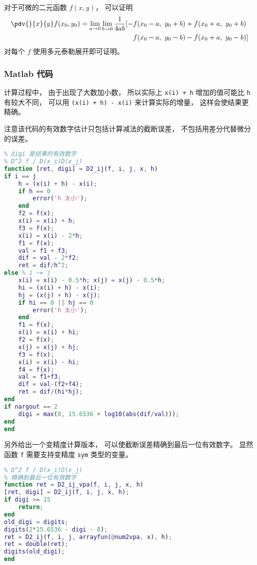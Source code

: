 
\begin{issues}
\issueDraft
\end{issues}


对于可微的二元函数 $f(x,y)$， 可以证明
\begin{equation}
\begin{aligned}
\pdv{}{x}{y} f(x_0,y_0) = \lim_{a\to 0}\lim_{b\to 0}\frac{1}{4ab}[-& f(x_0-a,\ y_0+b) + f(x_0+a,\  y_0+b)\\
& f(x_0-a,\  y_0-b) - f(x_0+a,\  y_0-b)]
\end{aligned}
\end{equation}
对每个 $f$ 使用多元泰勒展开即可证明。

\subsubsection{Matlab 代码}

计算过程中， 由于出现了大数加小数， 所以实际上 \verb|x(i) + h| 增加的值可能比 \verb|h| 有较大不同， 可以用 \verb|(x(i) + h) - x(i)| 来计算实际的增量， 这样会使结果更精确。

注意该代码的有效数字估计只包括计算减法的截断误差， 不包括用差分代替微分的误差。
\begin{lstlisting}[language=matlab, caption=D2\_ij.m]
% 数值二阶偏导
% digi 是结果的有效数字
% D^2 f / D(x_i)D(x_j)
function [ret, digi] = D2_ij(f, i, j, x, h)
if i == j
    h = (x(i) + h) - x(i);
    if h == 0
        error('h 太小');
    end
    f2 = f(x);
    x(i) = x(i) + h;
    f3 = f(x);
    x(i) = x(i) - 2*h;
    f1 = f(x);
    val = f1 + f3;
    dif = val - 2*f2;
    ret = dif/h^2;
else % i ~= j
    x(i) = x(i) - 0.5*h; x(j) = x(j) - 0.5*h;
    hi = (x(i) + h) - x(i);
    hj = (x(j) + h) - x(j);
    if hi == 0 || hj == 0
        error('h 太小');
    end
    f1 = f(x);
    x(i) = x(i) + hi;
    f2 = f(x);
    x(j) = x(j) + hj;
    f3 = f(x);
    x(i) = x(i) - hi;
    f4 = f(x);
    val = f1+f3;
    dif = val-(f2+f4);
    ret = dif/(hi*hj);
end
if nargout == 2
    digi = max(0, 15.6536 + log10(abs(dif/val)));
end
end
\end{lstlisting}

另外给出一个变精度计算版本， 可以使截断误差精确到最后一位有效数字。 显然函数 \verb|f| 需要支持变精度 \verb|sym| 类型的变量。
\begin{lstlisting}[language=matlab, caption=D2\_ij\_vpa.m]
% 数值二阶偏导 (变精度)
% D^2 f / D(x_i)D(x_j)
% 精确到最后一位有效数字
function ret = D2_ij_vpa(f, i, j, x, h)
[ret, digi] = D2_ij(f, i, j, x, h);
if digi >= 15
    return;
end
old_digi = digits;
digits(2*15.6536 - digi - 8);
ret = D2_ij(f, i, j, arrayfun(@num2vpa, x), h);
ret = double(ret);
digits(old_digi);
end
\end{lstlisting}
